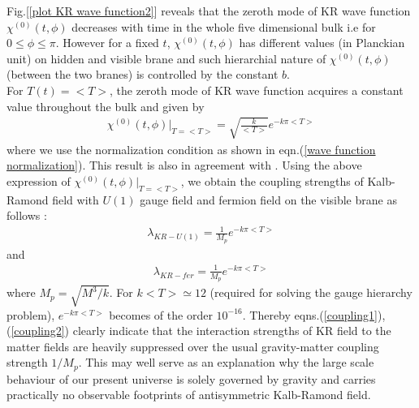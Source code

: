 \documentclass[a4paper]{article}
\begin{document}
Fig.[\ref{plot KR wave function2}] reveals that the zeroth mode of KR wave function $\chi^{(0)}(t,\phi)$ decreases with time in 
the whole five dimensional bulk 
i.e for $0 \leq \phi \leq \pi$. However for a fixed $t$, $\chi^{(0)}(t,\phi)$ has different values (in Planckian unit) on hidden and visible brane 
and such hierarchial nature of $\chi^{(0)}(t,\phi)$ (between the two branes) is controlled by the constant $b$.\\
For $T(t) = <T>$, the zeroth mode of KR wave function acquires a constant value throughout the bulk and given by 
\begin{eqnarray}
\chi^{(0)}(t,\phi)\bigg|_{T=<T>} = \sqrt{\frac{k}{<T>}}e^{-k\pi<T>}
\label{constant}
\end{eqnarray}
where we use the normalization condition as shown in eqn.(\ref{wave function normalization}). 
This result is also in agreement with \cite{ssg_prl}. Using the above expression of $\chi^{(0)}(t,\phi)\bigg|_{T=<T>}$, we obtain the coupling 
strengths of Kalb-Ramond field with $U(1)$ gauge field and fermion field on the visible brane as follows \cite{ssg_prl}:
\begin{eqnarray}
 \lambda_{KR-U(1)} = \frac{1}{M_p}e^{-k\pi<T>}
 \label{coupling1}
\end{eqnarray}
and
\begin{eqnarray}
 \lambda_{KR-fer} = \frac{1}{M_p}e^{-k\pi<T>}
 \label{coupling2}
\end{eqnarray}
where $M_p=\sqrt{M^3/k}$. For $k<T> \simeq 12$ (required for solving the gauge hierarchy problem), $e^{-k\pi<T>}$ 
becomes of the order $10^{-16}$. Thereby eqns.(\ref{coupling1}), (\ref{coupling2}) clearly indicate that 
the interaction strengths of KR field to the matter fields are heavily suppressed over the usual 
gravity-matter coupling strength $1/M_p$. This may well serve as an explanation why the large scale behaviour of our 
present universe is solely governed by gravity and carries practically no observable footprints of antisymmetric Kalb-Ramond field.\\
\end{document}
